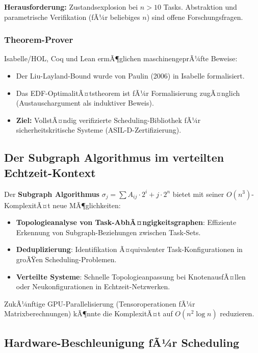 ﻿\documentclass[a4paper,12pt]{report}
\theoremstyle{definition}
\begin{document}
\textbf{Herausforderung:} Zustandsexplosion bei $n > 10$ Tasks.
Abstraktion und parametrische Verifikation (fÃ¼r beliebiges $n$) sind
offene Forschungsfragen.

\subsubsection{Theorem-Prover}

Isabelle/HOL, Coq und Lean ermÃ¶glichen maschinengeprÃ¼fte Beweise:
\begin{itemize}
	\item Der Liu-Layland-Bound wurde von Paulin (2006) in Isabelle formalisiert.
	\item Das EDF-OptimalitÃ¤tstheorem ist fÃ¼r Formalisierung zugÃ¤nglich
	      (Austauschargument als induktiver Beweis).
	\item \textbf{Ziel:} VollstÃ¤ndig verifizierte Scheduling-Bibliothek fÃ¼r
	      sicherheitskritische Systeme (ASIL-D-Zertifizierung).
\end{itemize}

\subsection{Der Subgraph Algorithmus im verteilten Echtzeit-Kontext}

Der \textbf{Subgraph Algorithmus} $\sigma_j = \sum A_{ij} \cdot 2^i + j \cdot 2^n$
\cite{Epp2026} bietet mit seiner $O(n^3)$-KomplexitÃ¤t neue MÃ¶glichkeiten:

\begin{itemize}
	\item \textbf{Topologieanalyse von Task-AbhÃ¤ngigkeitsgraphen}: Effiziente
	      Erkennung von Subgraph-Beziehungen zwischen Task-Sets.
	\item \textbf{Deduplizierung}: Identifikation Ã¤quivalenter Task-Konfigurationen
	      in groÃŸen Scheduling-Problemen.
	\item \textbf{Verteilte Systeme}: Schnelle Topologieanpassung bei KnotenausfÃ¤llen
	      oder Neukonfigurationen in Echtzeit-Netzwerken.
\end{itemize}

ZukÃ¼nftige GPU-Parallelisierung (Tensoroperationen fÃ¼r Matrixberechnungen)
kÃ¶nnte die KomplexitÃ¤t auf $O(n^2 \log n)$ reduzieren.

\subsection{Hardware-Beschleunigung fÃ¼r Scheduling}
\end{document}
